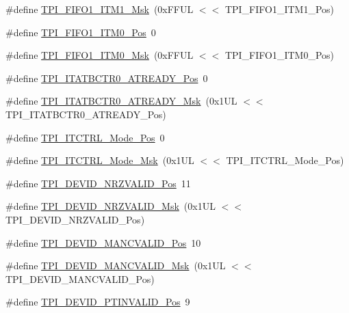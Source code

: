 \begin{DoxyCompactItemize}
\#define \hyperlink{group__CMSIS__TPI_ga3347f42828920dfe56e3130ad319a9e6}{T\-P\-I\-\_\-\-F\-I\-F\-O1\-\_\-\-I\-T\-M1\-\_\-\-Msk}~(0x\-F\-F\-U\-L $<$$<$ T\-P\-I\-\_\-\-F\-I\-F\-O1\-\_\-\-I\-T\-M1\-\_\-\-Pos)
\item 
\#define \hyperlink{group__CMSIS__TPI_ga2188671488417a52abb075bcd4d73440}{T\-P\-I\-\_\-\-F\-I\-F\-O1\-\_\-\-I\-T\-M0\-\_\-\-Pos}~0
\item 
\#define \hyperlink{group__CMSIS__TPI_ga8ae09f544fc1a428797e2a150f14a4c9}{T\-P\-I\-\_\-\-F\-I\-F\-O1\-\_\-\-I\-T\-M0\-\_\-\-Msk}~(0x\-F\-F\-U\-L $<$$<$ T\-P\-I\-\_\-\-F\-I\-F\-O1\-\_\-\-I\-T\-M0\-\_\-\-Pos)
\item 
\#define \hyperlink{group__CMSIS__TPI_gab1eb6866c65f02fa9c83696b49b0f346}{T\-P\-I\-\_\-\-I\-T\-A\-T\-B\-C\-T\-R0\-\_\-\-A\-T\-R\-E\-A\-D\-Y\-\_\-\-Pos}~0
\item 
\#define \hyperlink{group__CMSIS__TPI_gaee320b3c60f9575aa96a8742c4ff9356}{T\-P\-I\-\_\-\-I\-T\-A\-T\-B\-C\-T\-R0\-\_\-\-A\-T\-R\-E\-A\-D\-Y\-\_\-\-Msk}~(0x1\-U\-L $<$$<$ T\-P\-I\-\_\-\-I\-T\-A\-T\-B\-C\-T\-R0\-\_\-\-A\-T\-R\-E\-A\-D\-Y\-\_\-\-Pos)
\item 
\#define \hyperlink{group__CMSIS__TPI_gaa847adb71a1bc811d2e3190528f495f0}{T\-P\-I\-\_\-\-I\-T\-C\-T\-R\-L\-\_\-\-Mode\-\_\-\-Pos}~0
\item 
\#define \hyperlink{group__CMSIS__TPI_gad6f87550b468ad0920d5f405bfd3f017}{T\-P\-I\-\_\-\-I\-T\-C\-T\-R\-L\-\_\-\-Mode\-\_\-\-Msk}~(0x1\-U\-L $<$$<$ T\-P\-I\-\_\-\-I\-T\-C\-T\-R\-L\-\_\-\-Mode\-\_\-\-Pos)
\item 
\#define \hyperlink{group__CMSIS__TPI_ga9f46cf1a1708575f56d6b827766277f4}{T\-P\-I\-\_\-\-D\-E\-V\-I\-D\-\_\-\-N\-R\-Z\-V\-A\-L\-I\-D\-\_\-\-Pos}~11
\item 
\#define \hyperlink{group__CMSIS__TPI_gacecc8710a8f6a23a7d1d4f5674daf02a}{T\-P\-I\-\_\-\-D\-E\-V\-I\-D\-\_\-\-N\-R\-Z\-V\-A\-L\-I\-D\-\_\-\-Msk}~(0x1\-U\-L $<$$<$ T\-P\-I\-\_\-\-D\-E\-V\-I\-D\-\_\-\-N\-R\-Z\-V\-A\-L\-I\-D\-\_\-\-Pos)
\item 
\#define \hyperlink{group__CMSIS__TPI_ga675534579d9e25477bb38970e3ef973c}{T\-P\-I\-\_\-\-D\-E\-V\-I\-D\-\_\-\-M\-A\-N\-C\-V\-A\-L\-I\-D\-\_\-\-Pos}~10
\item 
\#define \hyperlink{group__CMSIS__TPI_ga4c3ee4b1a34ad1960a6b2d6e7e0ff942}{T\-P\-I\-\_\-\-D\-E\-V\-I\-D\-\_\-\-M\-A\-N\-C\-V\-A\-L\-I\-D\-\_\-\-Msk}~(0x1\-U\-L $<$$<$ T\-P\-I\-\_\-\-D\-E\-V\-I\-D\-\_\-\-M\-A\-N\-C\-V\-A\-L\-I\-D\-\_\-\-Pos)
\item 
\#define \hyperlink{group__CMSIS__TPI_ga974cccf4c958b4a45cb71c7b5de39b7b}{T\-P\-I\-\_\-\-D\-E\-V\-I\-D\-\_\-\-P\-T\-I\-N\-V\-A\-L\-I\-D\-\_\-\-Pos}~9

\end{DoxyCompactItemize}
